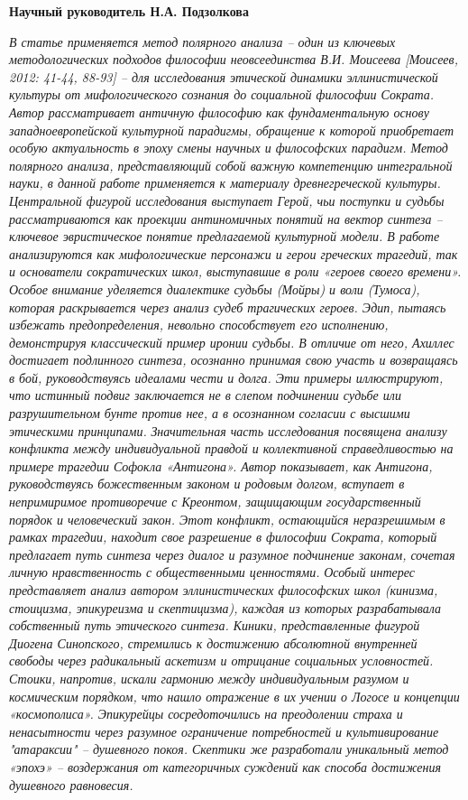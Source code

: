     {\raggedleft \textbf{Научный руководитель Н.А. Подзолкова} \par}

    \textit{В статье применяется метод полярного анализа – один из ключевых методологических подходов философии неовсеединства В.И. Моисеева [Моисеев, 2012: 41-44, 88-93] – для исследования этической динамики эллинистической культуры от мифологического сознания до социальной философии Сократа. Автор рассматривает античную философию как фундаментальную основу западноевропейской культурной парадигмы, обращение к которой приобретает особую актуальность в эпоху смены научных и философских парадигм. Метод полярного анализа, представляющий собой важную компетенцию интегральной науки, в данной работе применяется к материалу древнегреческой культуры. Центральной фигурой исследования выступает Герой, чьи поступки и судьбы рассматриваются как проекции антиномичных понятий на вектор синтеза – ключевое эвристическое понятие предлагаемой культурной модели. В работе анализируются как мифологические персонажи и герои греческих трагедий, так и основатели сократических школ, выступавшие в роли «героев своего времени».}
    \textit{Особое внимание уделяется диалектике судьбы (Мойры) и воли (Тумоса), которая раскрывается через анализ судеб трагических героев. Эдип, пытаясь избежать предопределения, невольно способствует его исполнению, демонстрируя классический пример иронии судьбы. В отличие от него, Ахиллес достигает подлинного синтеза, осознанно принимая свою участь и возвращаясь в бой, руководствуясь идеалами чести и долга. Эти примеры иллюстрируют, что истинный подвиг заключается не в слепом подчинении судьбе или разрушительном бунте против нее, а в осознанном согласии с высшими этическими принципами.}
    \textit{Значительная часть исследования посвящена анализу конфликта между индивидуальной правдой и коллективной справедливостью на примере трагедии Софокла «Антигона». Автор показывает, как Антигона, руководствуясь божественным законом и родовым долгом, вступает в непримиримое противоречие с Креонтом, защищающим государственный порядок и человеческий закон. Этот конфликт, остающийся неразрешимым в рамках трагедии, находит свое разрешение в философии Сократа, который предлагает путь синтеза через диалог и разумное подчинение законам, сочетая личную нравственность с общественными ценностями.}
    \textit{Особый интерес представляет анализ автором эллинистических философских школ (кинизма, стоицизма, эпикуреизма и скептицизма), каждая из которых разрабатывала собственный путь этического синтеза. Киники, представленные фигурой Диогена Синопского, стремились к достижению абсолютной внутренней свободы через радикальный аскетизм и отрицание социальных условностей. Стоики, напротив, искали гармонию между индивидуальным разумом и космическим порядком, что нашло отражение в их учении о Логосе и концепции «космополиса». Эпикурейцы сосредоточились на преодолении страха и ненасытности через разумное ограничение потребностей и культивирование "атараксии" – душевного покоя. Скептики же разработали уникальный метод «эпохэ» – воздержания от категоричных суждений как способа достижения душевного равновесия.}
